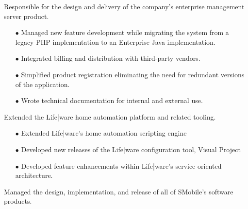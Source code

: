 \documentclass[12pt,letter,roman]{moderncv}
\begin{document}
\vspace{0.5em}

Responsible for the design and delivery of the company's enterprise management
server product.

\begin{itemize}

    \item[$\bullet$] Managed new feature development while migrating the system from a
        legacy PHP implementation to an Enterprise Java implementation.

    \item[$\bullet$] Integrated billing and distribution with third-party vendors.

    \item[$\bullet$] Simplified product registration eliminating the need for redundant
        versions of the application.

    \item[$\bullet$] Wrote technical documentation for internal and external use.

\end{itemize}

\vspace{0.5em}

Extended the Life|ware home automation platform and related tooling.

\begin{itemize}
    \item[$\bullet$] Extended Life|ware's home automation scripting engine
    \item[$\bullet$] Developed new releases of the Life|ware configuration tool, Visual Project
    \item[$\bullet$] Developed feature enhancements within Life|ware's service oriented architecture.
\end{itemize}

\vspace{0.5em}
 {}{}

Managed the design, implementation, and release of all of SMobile's software
products.
\end{document}

